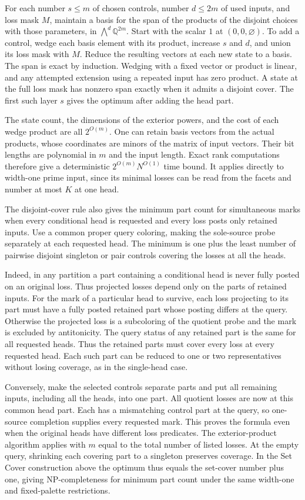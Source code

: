 For each number $s\leq m$ of chosen controls,
number $d\leq 2m$ of used inputs, and loss mask
$M$, maintain a basis for the span of the
products of the disjoint choices with those
parameters, in $\bigwedge^d\mathbb Q^{2m}$.
Start with the scalar $1$ at $(0,0,\varnothing)$.
To add a control, wedge each basis element with
its product, increase $s$ and $d$, and union its
loss mask with $M$. Reduce the resulting vectors
at each new state to a basis. The span is exact
by induction. Wedging with a fixed vector or
product is linear, and any attempted extension
using a repeated input has zero product.
A state at the full loss mask has nonzero span
exactly when it admits a disjoint cover. The first
such layer $s$ gives the optimum after adding the
head part.

The state count, the dimensions of the exterior
powers, and the cost of each wedge product are
all $2^{O(m)}$. One can retain basis vectors from
the actual products, whose coordinates are minors
of the matrix of input vectors. Their bit lengths
are polynomial in $m$ and the input length.
Exact rank computations therefore give a
deterministic $2^{O(m)}N^{O(1)}$ time bound.
It applies directly to width-one
prime input, since its minimal
losses can be read from the facets
and number at most $K$ at one head.

The disjoint-cover rule also gives the minimum
part count for simultaneous marks when every
conditional head is requested and every loss
posts only retained inputs. Use a common proper
query coloring, making the sole-source probe
separately at each requested head. The minimum
is one plus the least number of pairwise disjoint
singleton or pair controls covering the losses
at all the heads.

Indeed, in any partition a part containing a
conditional head is never fully posted on an
original loss. Thus projected losses depend only
on the parts of retained inputs. For the mark of
a particular head to survive, each loss projecting
to its part must have a fully posted retained part
whose posting differs at the query. Otherwise the
projected loss is a subcoloring of the quotient
probe and the mark is excluded by antitonicity.
The query status of any retained part is the same
for all requested heads. Thus the retained parts
must cover every loss at every requested head.
Each such part can be reduced to one or two
representatives without losing coverage, as in
the single-head case.

Conversely, make the selected controls separate
parts and put all remaining inputs, including
all the heads, into one part. All quotient losses
are now at this common head part. Each has a
mismatching control part at the query, so
one-source completion supplies every requested
mark. This proves the formula even when the
original heads have different loss predicates.
The exterior-product algorithm applies with $m$
equal to the total number of listed losses.
At the empty query, shrinking each covering
part to a singleton preserves coverage. In the
Set Cover construction above the optimum thus
equals the set-cover number plus one, giving
NP-completeness for minimum part count under
the same width-one and fixed-palette restrictions.

